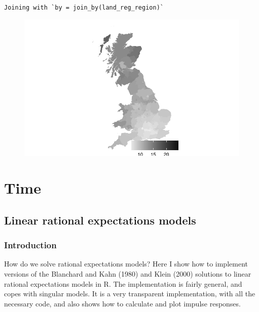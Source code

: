 \documentclass[
  letterpaper,
]{book}
\begin{document}
\begin{verbatim}
Joining with `by = join_by(land_reg_region)`
\end{verbatim}

\begin{figure}[H]

{\centering \includegraphics{./Maps_files/figure-pdf/unnamed-chunk-5-1.pdf}

}

\end{figure}

\part{Time}

\hypertarget{linear-rational-expectations-models}{%
\chapter{Linear rational expectations
models}\label{linear-rational-expectations-models}}

\hypertarget{introduction-2}{%
\section{Introduction}\label{introduction-2}}

How do we solve rational expectations models? Here I show how to
implement versions of the Blanchard and Kahn (1980) and Klein (2000)
solutions to linear rational expectations models in R. The
implementation is fairly general, and copes with singular models. It is
a very transparent implementation, with all the necessary code, and also
shows how to calculate and plot impulse responses.
\end{document}

